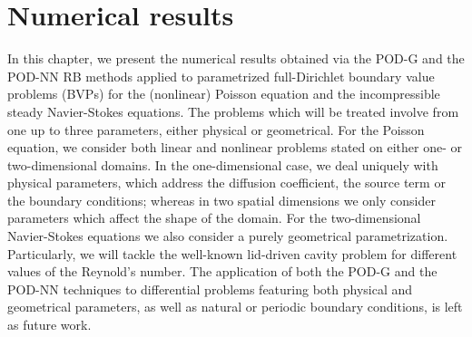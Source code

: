 \documentclass[12pt, a4paper, twoside, openright, notitlepage]{report}
\numberwithin{equation}{chapter}
\theoremstyle{theorem}
\theoremstyle{definition}
\theoremstyle{remark}
\theoremstyle{proposition}
\numberwithin{figure}{chapter}
\begin{document}
	
		
	\chapter{Numerical results}
	\label{chapter:Numerical results}
	
		In this chapter, we present the numerical results obtained via the POD-G and the POD-NN RB methods applied to parametrized full-Dirichlet boundary value problems (BVPs) for the (nonlinear) Poisson equation and the incompressible steady Navier-Stokes equations. The problems which will be treated involve from one up to three parameters, either physical or geometrical. For the Poisson equation, we consider both linear and nonlinear problems stated on either one- or two-dimensional domains. In the one-dimensional case, we deal uniquely with physical parameters, which address the diffusion coefficient, the source term or the boundary conditions; whereas in two spatial dimensions we only consider parameters which affect the shape of the domain. For the two-dimensional Navier-Stokes equations we also consider a purely geometrical parametrization. Particularly, we will tackle the well-known lid-driven cavity problem for different values of the Reynold's number. The application of both the POD-G and the POD-NN techniques to differential problems featuring both physical and geometrical parameters, as well as natural or periodic boundary conditions, is left as future work.
		
\end{document}
